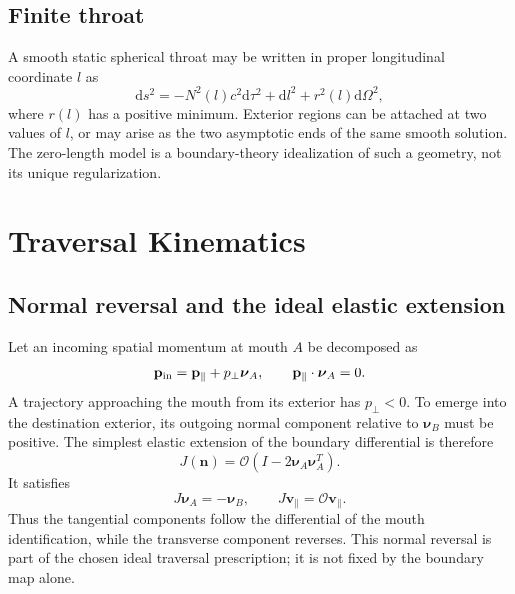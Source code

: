 \documentclass[journal,a4paper]{IEEEtran}
\begin{document}
\subsection{Finite throat}

A smooth static spherical throat may be written in proper longitudinal coordinate \(l\) as
\begin{equation}
    \mathrm{d}s^2=
    -N^2(l)c^2\mathrm{d}\tau^2
    +\mathrm{d}l^2
    +r^2(l)\mathrm{d}\Omega^2,
    \label{eq:generic_throat}
\end{equation}
where \(r(l)\) has a positive minimum. Exterior regions can be attached at two values of \(l\), or may arise as the two asymptotic ends of the same smooth solution. The zero-length model is a boundary-theory idealization of such a geometry, not its unique regularization.

\section{Traversal Kinematics}
\label{sec:kinematics}

\subsection{Normal reversal and the ideal elastic extension}

Let an incoming spatial momentum at mouth \(A\) be decomposed as
\begin{equation}
    \mathbf p_{\rm in}
    =\mathbf p_{\parallel}
    +p_{\perp}\boldsymbol\nu_A,
    \qquad
    \mathbf p_{\parallel}\cdot\boldsymbol\nu_A=0.
\end{equation}
A trajectory approaching the mouth from its exterior has \(p_{\perp}<0\). To emerge into the destination exterior, its outgoing normal component relative to \(\boldsymbol\nu_B\) must be positive. The simplest elastic extension of the boundary differential is therefore
\begin{equation}
    J(\mathbf n)
    =\mathcal O
    \left(I-2\boldsymbol\nu_A\boldsymbol\nu_A^T\right).
    \label{eq:spatial_traversal_map}
\end{equation}
It satisfies
\begin{equation}
    J\boldsymbol\nu_A=-\boldsymbol\nu_B,
    \qquad
    J\mathbf v_{\parallel}=\mathcal O\mathbf v_{\parallel}.
\end{equation}
Thus the tangential components follow the differential of the mouth identification, while the transverse component reverses. This normal reversal is part of the chosen ideal traversal prescription; it is not fixed by the boundary map alone.
\end{document}

